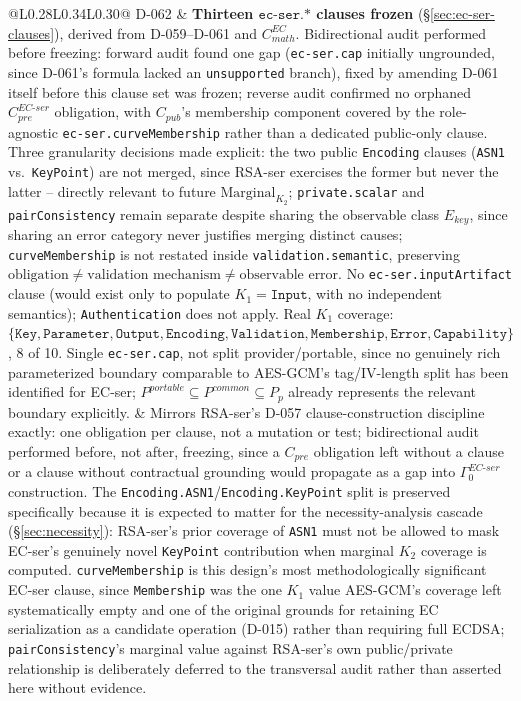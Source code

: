 \documentclass[11pt,a4paper]{article}
\begin{document}
\begin{longtable}{@{}L{0.28\textwidth}L{0.34\textwidth}L{0.30\textwidth}@{}}
D-062 & \textbf{Thirteen $\texttt{ec-ser.*}$ clauses frozen} (\S\ref{sec:ec-ser-clauses}), derived from D-059--D-061 and $C_{math}^{EC}$. Bidirectional audit performed before freezing: forward audit found one gap (\texttt{ec-ser.cap} initially ungrounded, since D-061's formula lacked an \texttt{unsupported} branch), fixed by amending D-061 itself before this clause set was frozen; reverse audit confirmed no orphaned $C_{pre}^{EC\text{-}ser}$ obligation, with $C_{pub}$'s membership component covered by the role-agnostic \texttt{ec-ser.curveMembership} rather than a dedicated public-only clause. Three granularity decisions made explicit: the two public \texttt{Encoding} clauses (\texttt{ASN1} vs.\ \texttt{KeyPoint}) are not merged, since RSA-ser exercises the former but never the latter -- directly relevant to future $\text{Marginal}_{K_2}$; \texttt{private.scalar} and \texttt{pairConsistency} remain separate despite sharing the observable class $E_{key}$, since sharing an error category never justifies merging distinct causes; \texttt{curveMembership} is not restated inside \texttt{validation.semantic}, preserving $\text{obligation}\neq\text{validation mechanism}\neq\text{observable error}$. No \texttt{ec-ser.inputArtifact} clause (would exist only to populate $K_1=\texttt{Input}$, with no independent semantics); \texttt{Authentication} does not apply. Real $K_1$ coverage: $\{\texttt{Key},\texttt{Parameter},\texttt{Output},\texttt{Encoding},\texttt{Validation},\texttt{Membership},\texttt{Error},\texttt{Capability}\}$, 8 of 10. Single \texttt{ec-ser.cap}, not split provider/portable, since no genuinely rich parameterized boundary comparable to AES-GCM's tag/IV-length split has been identified for EC-ser; $P^{portable}\subseteq P^{common}\subseteq P_p$ already represents the relevant boundary explicitly. & Mirrors RSA-ser's D-057 clause-construction discipline exactly: one obligation per clause, not a mutation or test; bidirectional audit performed before, not after, freezing, since a $C_{pre}$ obligation left without a clause or a clause without contractual grounding would propagate as a gap into $\Gamma_0^{EC\text{-}ser}$ construction. The \texttt{Encoding.ASN1}/\texttt{Encoding.KeyPoint} split is preserved specifically because it is expected to matter for the necessity-analysis cascade (\S\ref{sec:necessity}): RSA-ser's prior coverage of \texttt{ASN1} must not be allowed to mask EC-ser's genuinely novel \texttt{KeyPoint} contribution when marginal $K_2$ coverage is computed. \texttt{curveMembership} is this design's most methodologically significant EC-ser clause, since \texttt{Membership} was the one $K_1$ value AES-GCM's coverage left systematically empty and one of the original grounds for retaining EC serialization as a candidate operation (D-015) rather than requiring full ECDSA; \texttt{pairConsistency}'s marginal value against RSA-ser's own public/private relationship is deliberately deferred to the transversal audit rather than asserted here without evidence.\\

\end{longtable}
\end{document}
